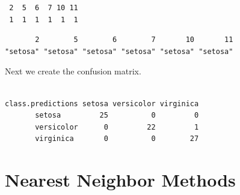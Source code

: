 \documentclass[
]{krantz}
\makeatletter
\newenvironment{Shaded}{\begin{snugshade}}{\end{snugshade}}
\newcommand{\DecValTok}[1]{\textcolor[rgb]{0.06,0.06,0.06}{#1}}
\newcommand{\KeywordTok}[1]{\textcolor[rgb]{0.27,0.27,0.27}{\textbf{#1}}}
\newcommand{\NormalTok}[1]{#1}
\newcommand{\OperatorTok}[1]{\textcolor[rgb]{0.43,0.43,0.43}{\textbf{#1}}}
\newcommand{\StringTok}[1]{\textcolor[rgb]{0.5,0.5,0.5}{#1}}
\newenvironment{kframe}{%
\medskip{}
\setlength{\fboxsep}{.8em}
 \def\at@end@of@kframe{}%
 \ifinner\ifhmode%
  \def\at@end@of@kframe{\end{minipage}}%
  \begin{minipage}{\columnwidth}%
 \fi\fi%
 \def\FrameCommand##1{\hskip\@totalleftmargin \hskip-\fboxsep
 \colorbox{shadecolor}{##1}\hskip-\fboxsep
     \hskip-\linewidth \hskip-\@totalleftmargin \hskip\columnwidth}%
 \MakeFramed {\advance\hsize-\width
   \@totalleftmargin\z@ \linewidth\hsize
   \@setminipage}}%
 {\par\unskip\endMakeFramed%
 \at@end@of@kframe}
\renewenvironment{Shaded}{\begin{kframe}}{\end{kframe}}
\makeatother
\begin{document}
\begin{verbatim}
 2  5  6  7 10 11 
 1  1  1  1  1  1 
\end{verbatim}

\begin{Shaded}
\end{Shaded}

\begin{verbatim}
       2        5        6        7       10       11 
"setosa" "setosa" "setosa" "setosa" "setosa" "setosa" 
\end{verbatim}

Next we create the confusion matrix.

\begin{Shaded}
\end{Shaded}

\begin{verbatim}
                 
class.predictions setosa versicolor virginica
       setosa         25          0         0
       versicolor      0         22         1
       virginica       0          0        27
\end{verbatim}

\hypertarget{nearest-neighbor-methods}{%
\section{Nearest Neighbor Methods}\label{nearest-neighbor-methods}}
\end{document}
